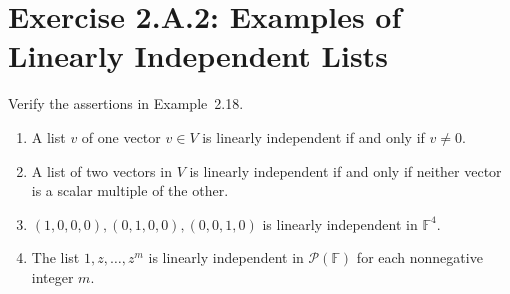 \section{Exercise 2.A.2: Examples of Linearly Independent Lists}
\label{Exercise 2.A.2}
Verify the assertions in Example~2.18.
\begin{enumerate}[label=(\alph*)]
\item A list $v$ of one vector $v\in V$ is linearly independent if and only if $v\ne 0$.
\item A list of two vectors in $V$ is linearly independent if and only if neither vector is a scalar multiple of the other.
\item $(1,0,0,0),(0,1,0,0),(0,0,1,0)$ is linearly independent in $\mathbb{F}^4$.
\item The list $1,z,\dots,z^m$ is linearly independent in $\mathcal{P}(\mathbb{F})$ for each nonnegative integer $m$.
\end{enumerate}
